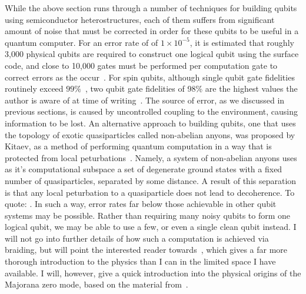 While the above section runs through a number of techniques for building qubits using semiconductor heterostructures,
each of them suffers from significant amount of noise that must be corrected in order for these qubits to be useful
in a quantum computer. For an error rate of of $1 \times 10^{-5}$, it is estimated that roughly 3,000 physical qubits
are required to construct one logical qubit using the surface code, and close to 10,000 gates must be performed per computation gate to correct
errors as the occur~\cite{6657074}. For spin qubits, although single qubit gate fidelities routinely exceed $99\%$~\cite{Zajac439}, two qubit
gate fidelities of 98\% are the highest values the author is aware of at time of writing~\cite{PhysRevA.99.042310}.
The source of error, as we discussed in previous sections, is caused by uncontrolled coupling to the environment, causing information
to be lost. An alternative approach to building qubits, one that uses the topology of exotic quasiparticles called non-abelian
anyons, was proposed by Kitaev, as a method of performing quantum computation in a way that is protected from local peturbations~\cite{KITAEV20032}.
Namely, a system of non-abelian anyons uses as it's computational subspace a set of degenerate ground states with a fixed number
of quasiparticles, separated by some distance. A result of this separation is that any local peturbation to a quasiparticle does not
lead to decoherence. To quote: . In such a way, error rates
far below those achievable in other qubit systems may be possible. Rather than requiring many noisy qubits to form one logical qubit,
we may be able to use a few, or even a single clean qubit instead. I will not go into
further details of how such a computation is achieved via braiding, but will point the interested reader towards~\cite{RevModPhys.80.1083}, which
gives a far more thorough introduction to the physics than I can in the limited space I have available. I will, however, give a quick introduction
into the physical origins of the Majorana zero mode, based on the material from~\cite{rafael_notes}.

